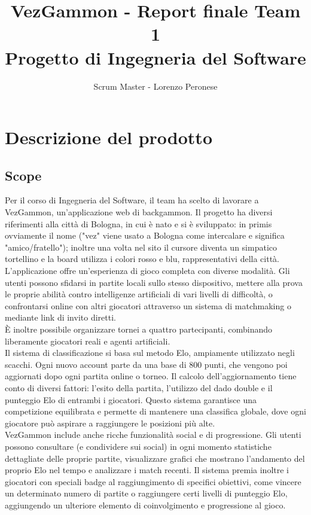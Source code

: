 \documentclass{article}
\title{VezGammon - Report finale Team 1 \\ \large Progetto di Ingegneria del Software}
\author{Scrum Master - Lorenzo Peronese}
\begin{document}
\maketitle

\tableofcontents

\newpage

\section{Descrizione del prodotto}
\subsection{Scope}
Per il corso di Ingegneria del Software, il team ha scelto di lavorare a VezGammon, un'applicazione web di backgammon. Il progetto ha diversi riferimenti 
alla città di Bologna, in cui è nato e si è sviluppato: in primis ovviamente il nome ("vez" viene usato a Bologna come intercalare e significa "amico/fratello"); 
inoltre una volta nel sito il cursore diventa un simpatico tortellino e la board utilizza i colori rosso e blu, rappresentativi della città. \\
L'applicazione offre un'esperienza di gioco completa con diverse modalità. Gli utenti possono sfidarsi in partite locali sullo stesso dispositivo, mettere alla prova 
le proprie abilità contro intelligenze artificiali di vari livelli di difficoltà, o confrontarsi online con altri giocatori attraverso un sistema di matchmaking 
o mediante link di invito diretti. \\
È inoltre possibile organizzare tornei a quattro partecipanti, combinando liberamente giocatori reali e agenti artificiali. \\
Il sistema di classificazione si basa sul metodo Elo, ampiamente utilizzato negli scacchi. Ogni nuovo account parte da una base di 800 punti, che vengono poi 
aggiornati dopo ogni partita online o torneo. Il calcolo dell'aggiornamento tiene conto di diversi fattori: l'esito della partita, l'utilizzo del dado double 
e il punteggio Elo di entrambi i giocatori. Questo sistema garantisce una competizione equilibrata e permette di mantenere una classifica globale, 
dove ogni giocatore può aspirare a raggiungere le posizioni più alte. \\
VezGammon include anche ricche funzionalità social e di progressione. Gli utenti possono consultare (e condividere sui social) in ogni momento statistiche dettagliate delle proprie partite, 
visualizzare grafici che mostrano l'andamento del proprio Elo nel tempo e analizzare i match recenti. Il sistema premia inoltre i giocatori con speciali badge 
al raggiungimento di specifici obiettivi, come vincere un determinato numero di partite o raggiungere certi livelli di punteggio Elo, aggiungendo un ulteriore 
elemento di coinvolgimento e progressione al gioco. \\
\end{document}
